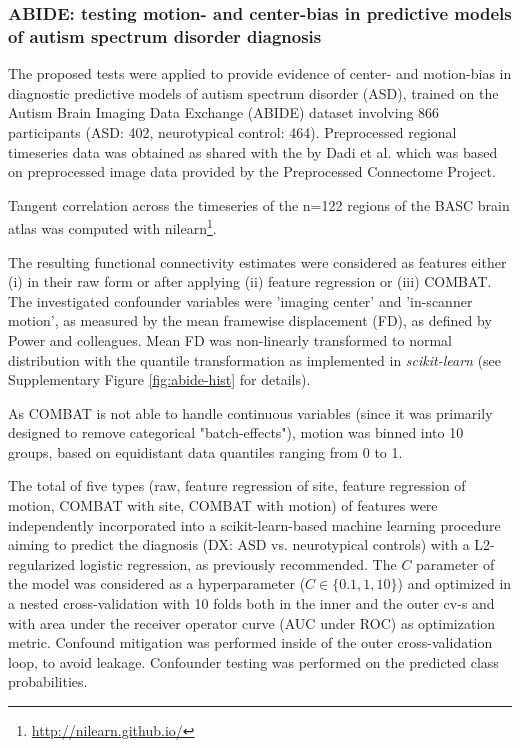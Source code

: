 \documentclass{article}
\begin{document}
\subsubsection*{ABIDE: testing motion- and center-bias in predictive models of autism spectrum disorder diagnosis}

The proposed tests were applied to provide evidence of center- and  motion-bias in diagnostic predictive models of autism spectrum disorder (ASD), trained on the Autism Brain Imaging Data Exchange (ABIDE) dataset\citep{di2014autism} involving 866 participants (ASD: 402, neurotypical control: 464). Preprocessed regional timeseries data was obtained as shared with the by Dadi et al.\citep{dadi2019benchmarking} which was based on preprocessed image data provided by the Preprocessed Connectome Project\citep{craddock2013neuro}.

Tangent correlation across the timeseries of the n=122 regions of the BASC\citep{bellec2010multi} brain atlas was computed with nilearn\footnote{\href{http://nilearn.github.io/}{http://nilearn.github.io/}}\citep{huntenburg2017loading, esteve2015big}. 

The resulting functional connectivity estimates were considered as features either (i) in their raw form or after applying (ii) feature regression\citep{rao2017predictive} or (iii) COMBAT\citep{johnson2007adjusting, fortin2018harmonization}.
The investigated confounder variables were 'imaging center' and 'in-scanner motion', as measured by the mean framewise displacement (FD), as defined by Power and colleagues\cite{power2014methods}.
Mean FD was non-linearly transformed to normal distribution with the quantile transformation\citep{beasley2009rank} as implemented in \emph{scikit-learn}\citep{pedregosa2011scikit} (see Supplementary Figure \ref{fig:abide-hist} for details).

As COMBAT is not able to handle continuous variables (since it was primarily designed to remove categorical "batch-effects"), motion was binned into 10 groups, based on equidistant data quantiles ranging from 0 to 1.

The total of five types (raw, feature regression of site, feature regression of motion, COMBAT with site, COMBAT with motion) of features were independently incorporated into a scikit-learn-based\citep{pedregosa2011scikit} machine learning procedure aiming to predict the diagnosis (DX: ASD vs. neurotypical controls) with a L2-regularized logistic regression, as previously recommended\citep{dadi2019benchmarking}. The $C$ parameter of the model was considered as a hyperparameter ($C \in \{0.1, 1, 10\}$) and optimized in a nested cross-validation with 10 folds both in the inner and the outer cv-s and with area under the receiver operator curve (AUC under ROC) as optimization metric. Confound mitigation was performed inside of the outer cross-validation loop, to avoid leakage.
Confounder testing was performed on the predicted class probabilities.
\end{document}
